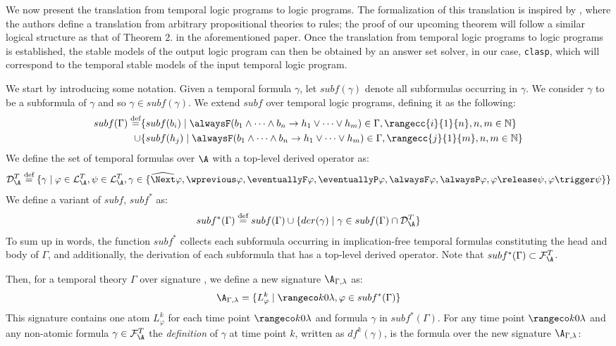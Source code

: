 We now present the translation from temporal logic programs to logic
programs. The formalization of this translation is inspired by
\cite[p. 9]{capeva05a}, where the authors define a translation from
arbitrary propositional theories to rules; the proof of our upcoming
theorem will follow a similar logical structure as that of Theorem
2. in the aforementioned paper. Once the translation from temporal
logic programs to logic programs is established, the stable models of
the output logic program can then be obtained by an answer set solver,
in our case, \verb|clasp|, which will correspond to the temporal
stable models of the input temporal logic program.

We start by introducing some notation.  Given a temporal formula
$\gamma$, let $subf(\gamma)$ denote all subformulas occurring in
$\gamma$. We consider $\gamma$ to be a subformula of $\gamma$ and so
$\gamma \in subf(\gamma)$. We extend $subf$ over temporal logic
programs, defining it as the following:
\begin{align*}
subf(\Gamma) \defeq &\{ subf(b_i) \mid \temprulelong \in \Gamma, \rangecc{i}{1}{n}, n,m \in \mathbb{N} \}\\
  \cup &\{ subf(h_j) \mid \temprulelong \in \Gamma,\rangecc{j}{1}{m}, n,m \in \mathbb{N} \}
\end{align*}
We define the set of temporal formulas over $\A$ with a top-level
derived operator as:
$$
\mathcal{D}_{\A}^{T} \defeq \{ \gamma \mid \varphi \in
\mathcal{L}_{\A}^{T}, \psi \in \mathcal{L}_{\A}^{T}, 
\gamma \in \{ \wnext\varphi, \wprevious\varphi, \eventuallyF\varphi,
              \eventuallyP\varphi, \alwaysF\varphi, \alwaysP\varphi, \varphi
              \release \psi, \varphi \trigger \psi \} \}
$$
We define a variant of $subf$, $subf^*$ as:
$$
subf^*(\Gamma) \defeq subf(\Gamma) \cup \{ der(\gamma) \mid \gamma \in subf(\Gamma) \cap \mathcal{D}_{\A}^{T} \}\\
$$
To sum up in words, the function $subf^*$ collects each subformula
occurring in implication-free temporal formulas constituting the head
and body of $\Gamma$, and additionally, the derivation of each
subformula that has a top-level derived operator. Note that
$subf^*(\Gamma) \subset \mathcal{F}_{\A}^{T}$.

Then, for a temporal theory $\Gamma$ over signature \A, we define a
new signature $\A_{\Gamma,\lambda}$ as:
$$
\A_{\Gamma,\lambda} = \{ L_{\varphi}^k \mid \kinlambda, \varphi \in subf^*(\Gamma) \}
$$
This signature contains one atom $L_\varphi^k$ for each time point
$\kinlambda$ and formula $\gamma$ in $subf^*(\Gamma)$. For any time
point $\kinlambda$ and any non-atomic formula
$\gamma \in \mathcal{F}_\A^T$ the \emph{definition} of $\gamma$ at
time point $k$, written as $df^k(\gamma)$, is the formula over the new
signature $\A_{\Gamma,\lambda}$:

